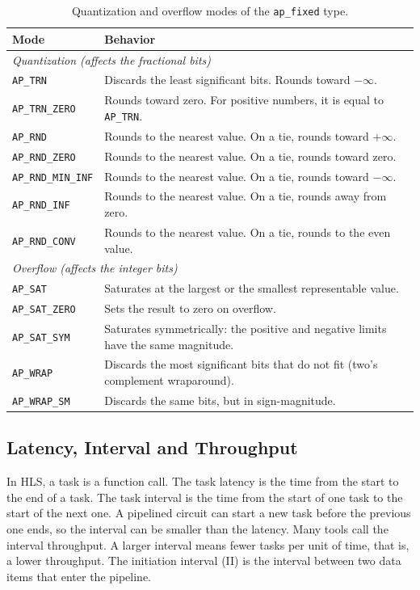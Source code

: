 \begin{table}[htbp]
\caption{Quantization and overflow modes of the \texttt{ap\_fixed} type.}
\label{tab:modos-apfixed}
\centering
\footnotesize
\begin{tabular}{p{2.6cm}p{11cm}}
\toprule
\textbf{Mode} & \textbf{Behavior} \\
\midrule
\multicolumn{2}{l}{\textit{Quantization (affects the fractional bits)}} \\
\texttt{AP\_TRN}       & Discards the least significant bits. Rounds toward $-\infty$. \\
\texttt{AP\_TRN\_ZERO} & Rounds toward zero. For positive numbers, it is equal to \texttt{AP\_TRN}. \\
\texttt{AP\_RND}       & Rounds to the nearest value. On a tie, rounds toward $+\infty$. \\
\texttt{AP\_RND\_ZERO} & Rounds to the nearest value. On a tie, rounds toward zero. \\
\texttt{AP\_RND\_MIN\_INF} & Rounds to the nearest value. On a tie, rounds toward $-\infty$. \\
\texttt{AP\_RND\_INF}  & Rounds to the nearest value. On a tie, rounds away from zero. \\
\texttt{AP\_RND\_CONV} & Rounds to the nearest value. On a tie, rounds to the even value. \\
\midrule
\multicolumn{2}{l}{\textit{Overflow (affects the integer bits)}} \\
\texttt{AP\_SAT}       & Saturates at the largest or the smallest representable value. \\
\texttt{AP\_SAT\_ZERO} & Sets the result to zero on overflow. \\
\texttt{AP\_SAT\_SYM}  & Saturates symmetrically: the positive and negative limits have the same magnitude. \\
\texttt{AP\_WRAP}      & Discards the most significant bits that do not fit (two's complement wraparound). \\
\texttt{AP\_WRAP\_SM}  & Discards the same bits, but in sign-magnitude. \\
\bottomrule
\end{tabular}
\end{table}

\subsection{Latency, Interval and Throughput}\label{subsubsec:latencia-intervalo}
In HLS, a task is a function call. The task latency is the time from the start to the end of a task. The task interval is the time from the start of one task to the start of the next one. A pipelined circuit can start a new task before the previous one ends, so the interval can be smaller than the latency. Many tools call the interval throughput. A larger interval means fewer tasks per unit of time, that is, a lower throughput. The initiation interval (II) is the interval between two data items that enter the pipeline.

